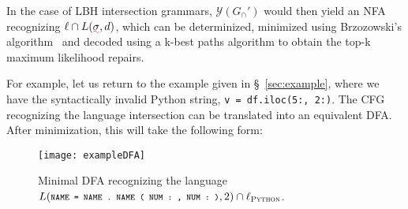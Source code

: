 \documentclass[sigplan,acmsmall,nonacm,screen]{acmart}\settopmatter{printfolios=false,printccs=false,printacmref=false}
\begin{document}
%
%
%

  In the case of LBH intersection grammars, $\mathcal{Y}(G_\cap')$ would then yield an NFA recognizing $\ell\cap L(\err\sigma, d)$, which can be determinized, minimized using Brzozowski's algorithm~\cite{brzozowski1964derivatives} and decoded using a k-best paths algorithm to obtain the top-k maximum likelihood repairs.

For example, let us return to the example given in \S~\ref{sec:example}, where we have the syntactically invalid Python string, \texttt{v = df.iloc(5:, 2:)}. The CFG recognizing the language intersection can be translated into an equivalent DFA. After minimization, this will take the following form:

\begin{figure}[H]
  \centering
  \texttt{[image: exampleDFA]}
  \caption{Minimal DFA recognizing the language $L(\footnotesize{\texttt{NAME = NAME . NAME ( NUM : , NUM : )}}, 2) \cap \ell_\textsc{Python}$.}
  \label{fig:exampleDFA}
\end{figure}
\end{document}
